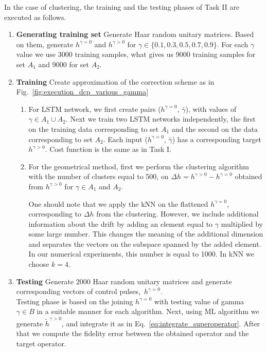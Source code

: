 \documentclass[aps,pra,showkeys,showpacs,notitlepage,superscriptaddress]{revtex4-1}
\newcommand{\1}{{\rm 1\hspace{-0.9mm}l}}
\newcommand{\NCP}{\ensuremath{h^{\gamma=0}}\xspace}
\newcommand{\DCP}{\ensuremath{h^{\gamma >0}}\xspace}
\newcommand{\CCP}{\ensuremath{\Delta h}\xspace}
\newcommand{\nnDCP}{\ensuremath{\tilde{h}^{\gamma >0}}\xspace}
\begin{document}
In the case of clustering, the training and the testing phases of Task II are executed as follows.

\begin{enumerate}
  \item \textbf{Generating training set} Generate Haar random unitary matrices. Based on them, generate \NCP and \DCP for $\gamma\in\{0.1,0.3,0.5,0.7,0.9\}$. For each $\gamma$ value we use 3000 training samples, what gives us 9000 training samples for set $A_1$ and 9000 for set $A_2$.
  
  
  \item \textbf{Training} Create approximation of the correction scheme as in Fig.~\ref{fig:execution_dcp_various_gamma}
  
  \begin{enumerate}
    \item For LSTM network, we first create pairs (\NCP, $\bar{\gamma}$), with values of $\gamma\in A_1 \cup A_2$. Next we train two LSTM networks independently, the first on the training data corresponding to set $A_1$ and the second on the data corresponding to set $A_2$. Each input (\NCP, $\bar{\gamma}$) has a corresponding target \DCP. Cost function is the same as in Task I.
    
    
    \item For the geometrical method, first we perform the clustering algorithm with the number of clusters equal to 500, on $\CCP = \DCP -\NCP$ obtained from \DCP for $\gamma \in A_1$ and $A_2$.
    
    One should note that we apply the kNN on the flattened \NCP, corresponding to \CCP from the clustering. However, we include additional information about the drift by adding an element equal to $\gamma$ multiplied by some large number.
    This changes the meaning of the additional dimension and separates the vectors on the subspace spanned by the added element. In our numerical experiments, this number is equal to 1000. In kNN we choose $k=4$.
     
  \end{enumerate}
  
  
  \item \textbf{Testing} Generate 2000 Haar random unitary matrices and generate corresponding vectors of control pulses,~\NCP.\\ 
  Testing phase is based on the joining \NCP with testing value of gamma $\gamma\in B$ in a suitable manner for each algorithm. Next, using ML algorithm we generate \nnDCP, and integrate it as in Eq.~\eqref{eq:integrate_superoperator}. After that we compute the fidelity error between the obtained operator and the target operator. 
  

\end{enumerate}
\end{document}

